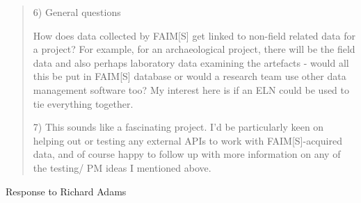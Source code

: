 \documentclass{faims3_report}
\begin{document}
\begin{quote}
6) General questions

How does data collected by FAIM{[}S{]} get linked to non-field related
data for a project? For example, for an archaeological project, there
will be the field data and also perhaps laboratory data examining the
artefacts - would all this be put in FAIM{[}S{]} database or would a
research team use other data management software too? My interest here
is if an ELN could be used to tie everything together.

7) This sounds like a fascinating project. I'd be particularly keen on
helping out or testing any external APIs to work with
FAIM{[}S{]}-acquired data, and of course happy to follow up with more
information on any of the testing/ PM ideas I mentioned above.
\end{quote}

Response to Richard Adams
\end{document}
